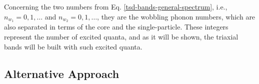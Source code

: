 Concerning the two numbers from Eq. \ref{tsd-bands-general-spectrum}, i.e., $n_{w_1}=0,1,\dots$ and $n_{w_2}=0,1,\dots$, they are the wobbling phonon numbers, which are also separated in terms of the core and the single-particle. These integers represent the number of excited quanta, and as it will be shown, the triaxial bands will be built with such excited quanta. 

\subsection{Alternative Approach}

